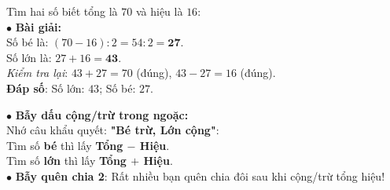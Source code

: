 \documentclass[14pt,a4paper,oneside]{extbook}
\begin{document}
\vspace{2mm}

\noindent
\begin{minipage}[t]{0.53\textwidth}
  \begin{tcolorbox}[
    enhanced,
    title={\footnotesize\bfseries\color{white}\faCheckCircle\ Ví dụ thực hành chuẩn mực},
    colback=green!2!white,
    colframe=green!60!black,
    arc=2.5mm, boxrule=0.8pt, top=1.8mm, bottom=1.8mm, left=2.2mm, right=2.2mm
  ]
    \footnotesize
    Tìm hai số biết tổng là $70$ và hiệu là $16$:\\
    $\bullet$ \textbf{Bài giải:}\\
    Số bé là: $(70 - 16) : 2 = 54 : 2 = \mathbf{27}$.\\
    Số lớn là: $27 + 16 = \mathbf{43}$.\\
    \textit{Kiểm tra lại}: $43 + 27 = 70$ (đúng), $43 - 27 = 16$ (đúng).\\
    \textbf{Đáp số}: Số lớn: $43$; Số bé: $27$.
  \end{tcolorbox}
\end{minipage}%
\hfill
\begin{minipage}[t]{0.45\textwidth}
  \begin{tcolorbox}[
    enhanced,
    title={\footnotesize\bfseries\color{white}\faExclamationTriangle\ Mẹo tránh bẫy trắc nghiệm},
    colback=red!2!white,
    colframe=red!70!black,
    arc=2.5mm, boxrule=0.8pt, top=1.8mm, bottom=1.8mm, left=2.2mm, right=2.2mm
  ]
    \footnotesize
    $\bullet$ \textbf{Bẫy dấu cộng/trừ trong ngoặc:}\\
    Nhớ câu khẩu quyết: \textbf{"Bé trừ, Lớn cộng"}:\\
    Tìm số \textbf{bé} thì lấy \textbf{Tổng $-$ Hiệu}.\\
    Tìm số \textbf{lớn} thì lấy \textbf{Tổng $+$ Hiệu}.\\
    $\bullet$ \textbf{Bẫy quên chia 2}: Rất nhiều bạn quên chia đôi sau khi cộng/trừ tổng hiệu!
  \end{tcolorbox}
\end{minipage}
\end{document}
